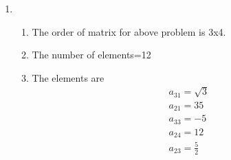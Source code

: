 \renewcommand{\theequation}{\theenumi}
\begin{enumerate}[label=\arabic*.,ref=\thesubsubsection.\theenumi]
\item
\begin{enumerate}
\item The order of matrix for above problem is 3x4.
\item The number of elements=12
\item The elements are
\begin{align}
a_{31}=\sqrt{3}
\\
a_{21}=35
\\
a_{33}=-5
\\
a_{24}=12
\\
a_{23}=\frac{5}{2}
\end{align}
\end{enumerate}
\end{enumerate}